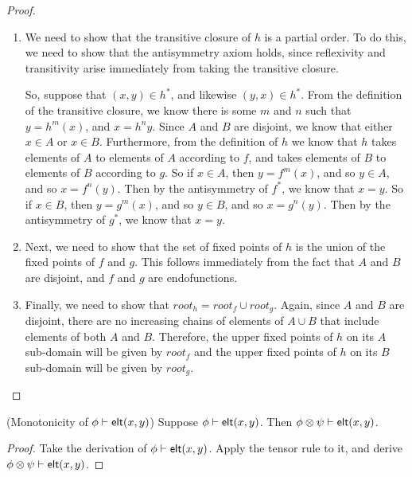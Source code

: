 \begin{proof}
\begin{enumerate}
\item We need to show that the transitive closure of $h$ is a partial
order. To do this, we need to show that the antisymmetry axiom holds, 
since reflexivity and transitivity arise immediately from taking the
transitive closure. 

So, suppose that $(x,y) \in h^{*}$, and likewise $(y, x) \in
h^{*}$. From the definition of the transitive closure, we know there
is some $m$ and $n$ such that $y = h^m(x)$, and $x = h^n{y}$.  Since
$A$ and $B$ are disjoint, we know that either $x \in A$ or $x \in
B$. Furthermore, from the definition of $h$ we know that $h$ takes
elements of $A$ to elements of $A$ according to $f$, and takes
elements of $B$ to elements of $B$ according to $g$. So if $x \in A$,
then $y = f^m(x)$, and so $y \in A$, and so $x = f^n(y)$.  Then by the
antisymmetry of $f^{*}$, we know that $x = y$. So if $x \in B$, then
$y = g^m(x)$, and so $y \in B$, and so $x = g^n(y)$.  Then by the
antisymmetry of $g^{*}$, we know that $x = y$.

\item Next, we need to show that the set of fixed points of $h$ is the
  union of the fixed points of $f$ and $g$. This follows immediately
  from the fact that $A$ and $B$ are disjoint, and $f$ and $g$ are
  endofunctions.

\item Finally, we need to show that $\mathit{root}_h = \mathit{root}_f
  \cup \mathit{root}_g$. Again, since $A$ and $B$ are disjoint, there
  are no increasing chains of elements of $A \cup B$ that include
  elements of both $A$ and $B$.  Therefore, the upper fixed points of
  $h$ on its $A$ sub-domain will be given by $\mathit{root}_f$ and the
  upper fixed points of $h$ on its $B$ sub-domain will be given by
  $\mathit{root}_g$.
\end{enumerate}
\end{proof}

\begin{lemma}{(Monotonicity of ${\phi} \vdash \mathsf{elt}({x}, {y})$)}
Suppose ${\phi} \vdash \mathsf{elt}({x}, {y})$. Then ${\phi \otimes \psi} \vdash \mathsf{elt}({x}, {y})$. 
\end{lemma}

\begin{proof}
Take the derivation of ${\phi} \vdash \mathsf{elt}({x}, {y})$. Apply the tensor rule 
to it, and derive ${\phi \otimes \psi} \vdash \mathsf{elt}({x}, {y})$.
\end{proof}

